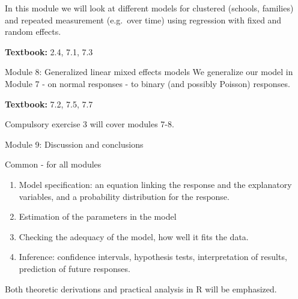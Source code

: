 \documentclass[
  ignorenonframetext,
]{beamer}
\begin{document}
\begin{frame}
In this module we will look at different models for clustered (schools,
families) and repeated measurement (e.g.~over time) using regression
with fixed and random effects.

\textbf{Textbook:} 2.4, 7.1, 7.3
\end{frame}

\begin{frame}
\begin{block}{Module 8: Generalized linear mixed effects models}
\protect\hypertarget{module-8-generalized-linear-mixed-effects-models}{}
We generalize our model in Module 7 - on normal responses - to binary
(and possibly Poisson) responses.

\textbf{Textbook:} 7.2, 7.5, 7.7

Compulsory exercise 3 will cover modules 7-8.
\end{block}

\begin{block}{Module 9: Discussion and conclusions}
\protect\hypertarget{module-9-discussion-and-conclusions}{}
\end{block}
\end{frame}

\begin{frame}
\begin{block}{Common - for all modules}
\protect\hypertarget{common---for-all-modules}{}
\begin{enumerate}
\item
  Model specification: an equation linking the response and the
  explanatory variables, and a probability distribution for the
  response.
\item
  Estimation of the parameters in the model
\item
  Checking the adequacy of the model, how well it fits the data.
\item
  Inference: confidence intervals, hypothesis tests, interpretation of
  results, prediction of future responses.
\end{enumerate}

Both theoretic derivations and practical analysis in R will be
emphasized.
\end{block}
\end{frame}
\end{document}
